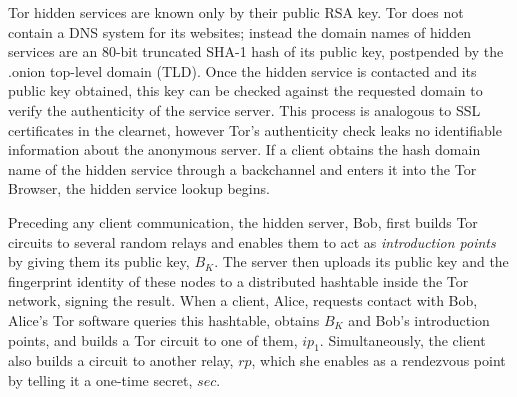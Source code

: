 Tor hidden services are known only by their public RSA key. Tor does not contain a DNS system for its websites; instead the domain names of hidden services are an 80-bit truncated SHA-1 hash of its public key, postpended by the .onion top-level domain (TLD). Once the hidden service is contacted and its public key obtained, this key can be checked against the requested domain to verify the authenticity of the service server. This process is analogous to SSL certificates in the clearnet, however Tor's authenticity check leaks no identifiable information about the anonymous server. If a client obtains the hash domain name of the hidden service through a backchannel and enters it into the Tor Browser, the hidden service lookup begins.

Preceding any client communication, the hidden server, Bob, first builds Tor circuits to several random relays and enables them to act as \textit{introduction points} by giving them its public key, $ B_{K} $. The server then uploads its public key and the fingerprint identity of these nodes to a distributed hashtable inside the Tor network, signing the result. When a client, Alice, requests contact with Bob, Alice's Tor software queries this hashtable, obtains $ B_{K} $ and Bob's introduction points, and builds a Tor circuit to one of them, $ ip_{1} $. Simultaneously, the client also builds a circuit to another relay, $ rp $, which she enables as a rendezvous point by telling it a one-time secret, $ sec $.


